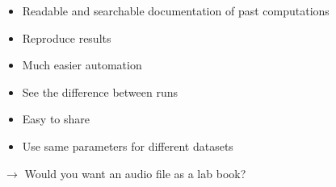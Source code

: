 \begin{itemize}
	\item Readable and searchable documentation of past computations
	\item Reproduce results
	\item Much easier automation
	\item See the difference between runs
	\item Easy to share
	\item Use same parameters for different datasets
\end{itemize}
$\rightarrow$ Would you want an audio file as a lab book?
